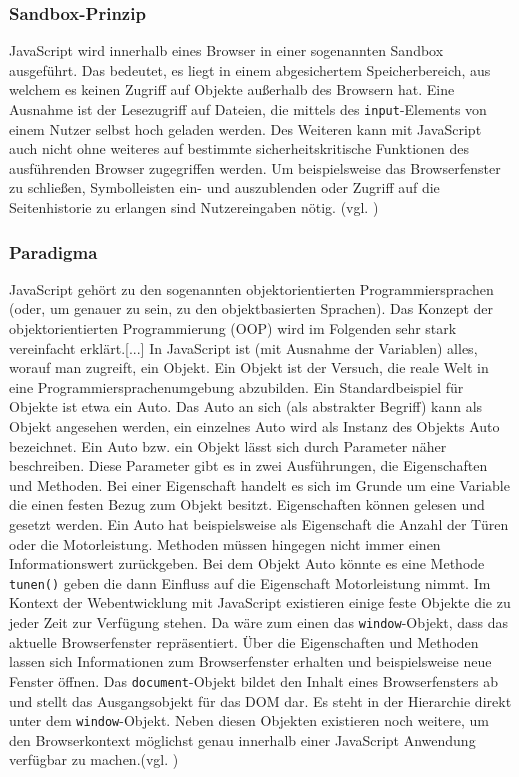 \subsubsection{Sandbox-Prinzip} JavaScript wird innerhalb eines Browser in einer sogenannten Sandbox ausgeführt. Das bedeutet, es liegt in einem abgesichertem Speicherbereich, aus welchem es keinen Zugriff auf Objekte außerhalb des Browsern hat. Eine Ausnahme ist der Lesezugriff auf Dateien, die mittels des \texttt{input}-Elements von einem Nutzer selbst hoch geladen werden. Des Weiteren kann mit JavaScript auch nicht ohne weiteres auf bestimmte sicherheitskritische Funktionen des ausführenden Browser zugegriffen werden. Um beispielsweise das Browserfenster zu schließen, Symbolleisten ein- und auszublenden oder Zugriff auf die Seitenhistorie zu erlangen sind Nutzereingaben nötig. (vgl. \cite{WikiJS2014})

\subsubsection{Paradigma} \glqq JavaScript gehört zu den sogenannten objektorientierten Programmiersprachen (oder, um genauer zu sein, zu den objektbasierten Sprachen). Das Konzept der objektorientierten Programmierung (OOP) wird im Folgenden sehr stark vereinfacht erklärt.[...] In JavaScript ist (mit Ausnahme der Variablen) alles, worauf man zugreift, ein Objekt. Ein Objekt ist der Versuch, die reale Welt in eine Programmiersprachenumgebung abzubilden. Ein Standardbeispiel für Objekte ist etwa ein Auto. Das Auto an sich (als abstrakter Begriff) kann als Objekt angesehen werden, ein einzelnes Auto wird als Instanz des Objekts Auto bezeichnet.\grqq{}\cite[S.93]{WenzJava2008} Ein Auto bzw. ein Objekt lässt sich durch Parameter näher beschreiben. Diese Parameter gibt es in zwei Ausführungen, die Eigenschaften und Methoden. Bei einer Eigenschaft handelt es sich im Grunde um eine Variable die einen festen Bezug zum Objekt besitzt. Eigenschaften können gelesen und gesetzt werden. Ein Auto hat beispielsweise als Eigenschaft die Anzahl der Türen oder die Motorleistung. Methoden müssen hingegen nicht immer einen Informationswert zurückgeben. Bei dem Objekt Auto könnte es eine Methode \texttt{tunen()} geben die dann Einfluss auf die Eigenschaft Motorleistung nimmt. Im Kontext der Webentwicklung mit JavaScript existieren einige feste Objekte die zu jeder Zeit zur Verfügung stehen. Da wäre zum einen das \texttt{window}-Objekt, dass das aktuelle Browserfenster repräsentiert. Über die Eigenschaften und Methoden lassen sich Informationen zum Browserfenster erhalten und beispielsweise neue Fenster öffnen. Das \texttt{document}-Objekt bildet den Inhalt eines Browserfensters ab und stellt das Ausgangsobjekt für das DOM dar. Es steht in der Hierarchie direkt unter dem \texttt{window}-Objekt. Neben diesen Objekten existieren noch weitere, um den Browserkontext möglichst genau innerhalb einer JavaScript Anwendung verfügbar zu machen.(vgl. \cite{SelfHtml20147})

